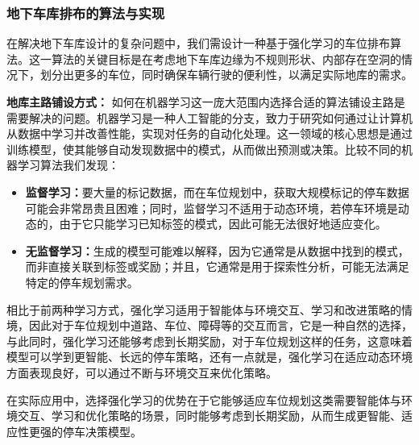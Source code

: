 \subsubsection{地下车库排布的算法与实现}
在解决地下车库设计的复杂问题中，我们需设计一种基于强化学习的车位排布算法。这一算法的关键目标是在考虑地下车库边缘为不规则形状、内部存在空洞的情况下，划分出更多的车位，同时确保车辆行驶的便利性，以满足实际地库的需求。

{\bfseries 地库主路铺设方式：}
如何在机器学习这一庞大范围内选择合适的算法铺设主路是需要解决的问题。机器学习是一种人工智能的分支，致力于研究如何通过让计算机从数据中学习并改善性能，实现对任务的自动化处理。这一领域的核心思想是通过训练模型，使其能够自动发现数据中的模式，从而做出预测或决策。比较不同的机器学习算法我们发现：
\begin{itemize}
    \item {\bfseries 监督学习：}要大量的标记数据，而在车位规划中，获取大规模标记的停车数据可能会非常昂贵且困难；同时，监督学习不适用于动态环境，若停车环境是动态的，由于它只能学习已知标签的模式，因此可能无法很好地适应变化。
    \item {\bfseries 无监督学习：}生成的模型可能难以解释，因为它通常是从数据中找到的模式，而非直接关联到标签或奖励；并且，它通常是用于探索性分析，可能无法满足特定的停车规划需求。
\end{itemize}

相比于前两种学习方式，强化学习适用于智能体与环境交互、学习和改进策略的情境，因此对于车位规划中道路、车位、障碍等的交互而言，它是一种自然的选择，与此同时，强化学习还能够考虑到长期奖励，对于车位规划这样的任务，这意味着模型可以学到更智能、长远的停车策略，还有一点就是，强化学习在适应动态环境方面表现良好，可以通过不断与环境交互来优化策略。

在实际应用中，选择强化学习的优势在于它能够适应车位规划这类需要智能体与环境交互、学习和优化策略的场景，同时能够考虑到长期奖励，从而生成更智能、适应性更强的停车决策模型。


